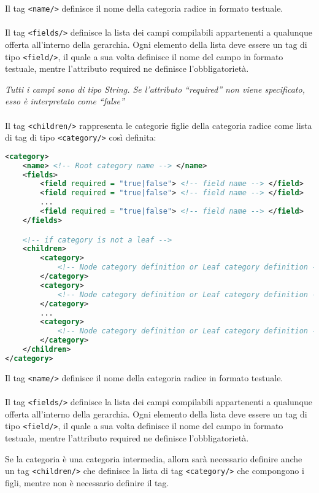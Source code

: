 Il tag \verb|<name/>| definisce il nome della categoria radice in formato testuale.
\\\\
Il tag \verb|<fields/>| definisce la lista dei campi compilabili appartenenti a qualunque offerta all'interno della gerarchia.
Ogni elemento della lista deve essere un tag di tipo \verb|<field/>|, il quale a sua volta definisce il nome del campo in formato testuale, mentre l'attributo required ne definisce l'obbligatorietà.

\textit{Tutti i campi sono di tipo String. Se l'attributo ``required'' non viene specificato, esso è interpretato come ``false''}
\\\\
Il tag \verb|<children/>| rappresenta le categorie figlie della categoria radice come lista di tag di tipo \verb|<category/>| così definita:

\begin{lstlisting}[language=XML]
<category>
    <name> <!-- Root category name --> </name>
    <fields>
        <field required = "true|false"> <!-- field name --> </field>
        <field required = "true|false"> <!-- field name --> </field>
        ...
        <field required = "true|false"> <!-- field name --> </field>
    </fields>

    <!-- if category is not a leaf -->
    <children>
        <category>
            <!-- Node category definition or Leaf category definition -->
        </category>
        <category>
            <!-- Node category definition or Leaf category definition -->
        </category>
        ...
        <category>
            <!-- Node category definition or Leaf category definition -->
        </category>
    </children>
</category>
\end{lstlisting}


Il tag \verb|<name/>| definisce il nome della categoria radice in formato testuale.
\\\\
Il tag \verb|<fields/>| definisce la lista dei campi compilabili appartenenti a qualunque offerta all'interno della gerarchia.
Ogni elemento della lista deve essere un tag di tipo \verb|<field/>|, il quale a sua volta definisce il nome del campo in formato testuale, mentre l'attributo required ne definisce l'obbligatorietà.

Se la categoria è una categoria intermedia, allora sarà necessario definire anche un tag \verb|<children/>| che definisce la lista di tag \verb|<category/>| che compongono i figli, mentre non è necessario definire il tag.

